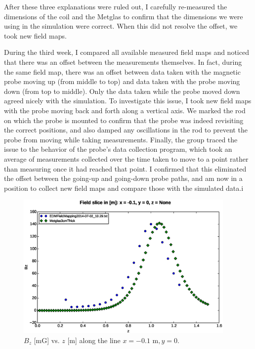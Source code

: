 \documentclass[twocolumn,aps,prb,citeautoscript]{revtex4-1}
\begin{document}
After these three explanations were ruled out, I carefully re-measured the dimensions of the coil and the
Metglas to confirm that the dimensions we were using in the simulation were correct. When this did not
resolve the offset, we took new field maps.

During the third week, I compared all available measured field maps and noticed that there was an offset between
the measurements themselves. In fact, during the same field map,
there was an offset between data taken with the magnetic probe
moving up (from middle to top) and data taken with the probe moving down (from top to middle).
Only the data taken while the probe moved down agreed nicely with the simulation.
To investigate
this issue, I took new field maps with the probe moving back and forth along a vertical axis. We marked the rod
on which the probe is mounted to confirm that the probe was indeed revisiting the correct positions, and also
damped any oscillations in the rod to prevent the probe from moving while taking measurements. Finally,
the group traced the issue to the behavior of the probe's data collection program, which took an average of
measurements collected over the time taken to move to a point rather than measuring once it had reached that point.
I confirmed that this eliminated the offset between the going-up and going-down probe paths, and am now in a position
to collect new field maps and compare those with the simulated data.i

\begin{figure}
\includegraphics[width=0.95\textwidth]{../savedplots/original_Bz.eps}
\caption{\label{fig:orig_Bz_z}$B_z$ [mG] vs. $z$ [m] along the line $x = -0.1 \text{ m}, y = 0$.}
\end{figure}
\end{document}
